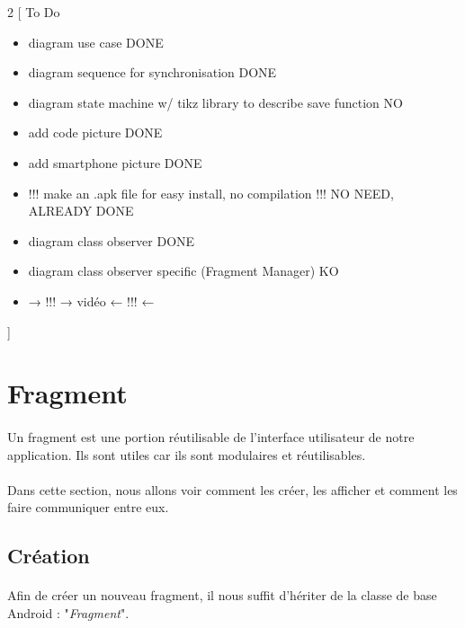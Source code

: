 \documentclass[a4paper]{article}
\begin{document}
    \newpage
    \begin{multicols}{2}
        [
            To Do
            \begin{itemize}
                \item diagram use case DONE
                \item diagram sequence for synchronisation DONE ~~~
                \item diagram state machine w/ tikz library to describe save function NO
                \item add code picture DONE
                \item add smartphone picture DONE
                \item !!! make an .apk file for easy install, no compilation !!! NO NEED, ALREADY DONE
                \item diagram class observer DONE
                \item diagram class observer specific (Fragment Manager) KO
                \item → !!! → vidéo ← !!! ← 
            \end{itemize}
        ]
        \section{Fragment}
            \paragraph{}
                Un fragment est une portion réutilisable de l'interface utilisateur de notre application. Ils sont utiles car ils sont modulaires et réutilisables. 
            \paragraph{}
                Dans cette section, nous allons voir comment les créer, les afficher et comment les faire communiquer entre eux.
            \subsection{Création}
                \paragraph{}
                    Afin de créer un nouveau fragment, il nous suffit d'hériter de la classe de base Android : "\emph{Fragment}".


\end{multicols}
\end{document}
